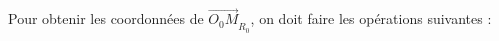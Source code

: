 \documentclass[11]{article}
\begin{document}
\begin{enumerate}
\begin{itemize}
\begin{multicols}{2}
\begin{minipage}{23em}
Pour obtenir les coordonnées de $\overrightarrow{O_0M}_{R_0}$, on doit faire les opérations suivantes :  \\
\end{minipage}
\end{multicols}
\end{itemize}



\end{enumerate}
\end{document}
